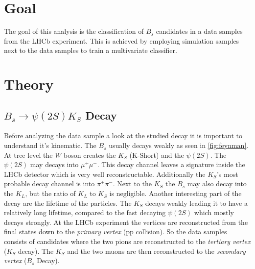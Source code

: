 \section{Goal}
\label{sec:Goal}

The goal of this analysis is the classification of $B_s$ candidates in a data samples from the LHCb experiment. This is achieved by employing simulation samples next to the data samples to train a  multivariate classifier.  

\section{Theory}
\label{sec:Theory}

\subsection{\texorpdfstring{$B_s \to \psi(2S)K_S$}{B_s -> Psi(2S)K_S} Decay}

Before analyzing the data sample a look at the studied decay \signal it is important to understand it's kinematic. The $B_s$ usually decays weakly as seen in \autoref{fig:feynman}. At tree level the $W$ boson creates the $K_S$ (K-Short) and the $\psi(2S)$. The $\psi(2S)$ may decays into $\mu^+\mu^-$. This decay channel leaves a signature inside the LHCb detector which is very well reconstructable. Additionally the $K_S$'s most probable decay channel is into $\pi^+\pi^-$. Next to the $K_S$ the $B_s$ may also decay into the $K_L$, but the ratio of $K_L$ to $K_S$ is negligible. Another interesting part of the decay are the lifetime of the particles. The $K_S$ decays weakly leading it to have a relatively long lifetime, compared to the fast decaying $\psi(2S)$ which mostly decays strongly. At the LHCb experiment the vertices are reconstructed from the final states down to the \textit{primary vertex} (pp collision). So the data samples consists of candidates where the two pions are reconstructed to the \textit{tertiary vertex} ($K_S$ decay). The $K_S$ and the two muons are then reconstructed to the \textit{secondary vertex} ($B_s$ Decay).

